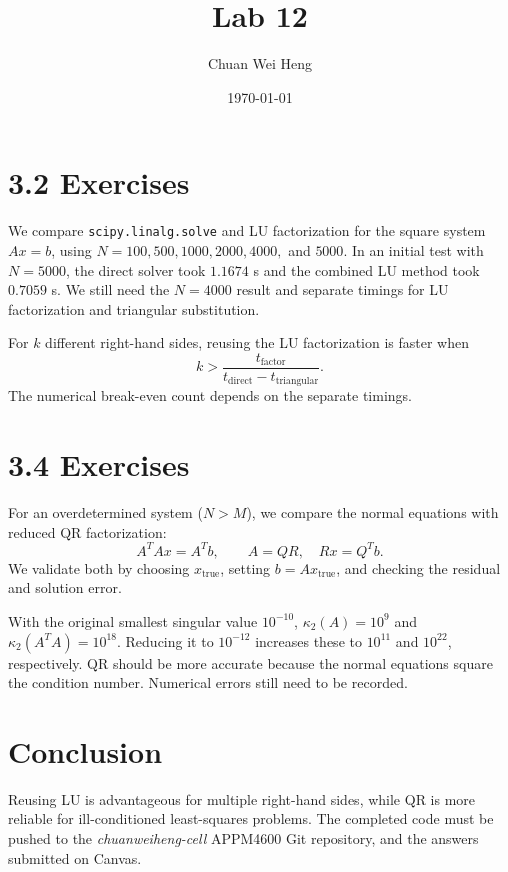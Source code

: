 \documentclass[12pt]{article}
\title{Lab 12}
\author{Chuan Wei Heng}
\date{\today}
\begin{document}
\maketitle

\section*{3.2 Exercises}

We compare \texttt{scipy.linalg.solve} and LU factorization for the square
system $Ax=b$, using $N=100,500,1000,2000,4000,$ and $5000$. In an
initial test with $N=5000$, the direct solver took $1.1674$ s and the
combined LU method took $0.7059$ s. We still need the $N=4000$ result
and separate timings for LU factorization and triangular substitution.

For $k$ different right-hand sides, reusing the LU factorization is
faster when
\[
k>\frac{t_{\mathrm{factor}}}
{t_{\mathrm{direct}}-t_{\mathrm{triangular}}}.
\]
The numerical break-even count depends on the separate timings.

\section*{3.4 Exercises}

For an overdetermined system ($N>M$), we compare the normal equations
with reduced QR factorization:
\[
A^TAx=A^Tb,\qquad A=QR,\quad Rx=Q^Tb.
\]
We validate both by choosing $x_{\mathrm{true}}$, setting
$b=Ax_{\mathrm{true}}$, and checking the residual and solution error.

With the original smallest singular value $10^{-10}$,
$\kappa_2(A)=10^9$ and $\kappa_2(A^TA)=10^{18}$. Reducing it to
$10^{-12}$ increases these to $10^{11}$ and $10^{22}$, respectively.
QR should be more accurate because the normal equations square the
condition number. Numerical errors still need to be recorded.

\section*{Conclusion}

Reusing LU is advantageous for multiple right-hand sides, while QR is
more reliable for ill-conditioned least-squares problems. The completed
code must be pushed to the \textit{chuanweiheng-cell} APPM4600 Git
repository, and the answers submitted on Canvas.
\end{document}
